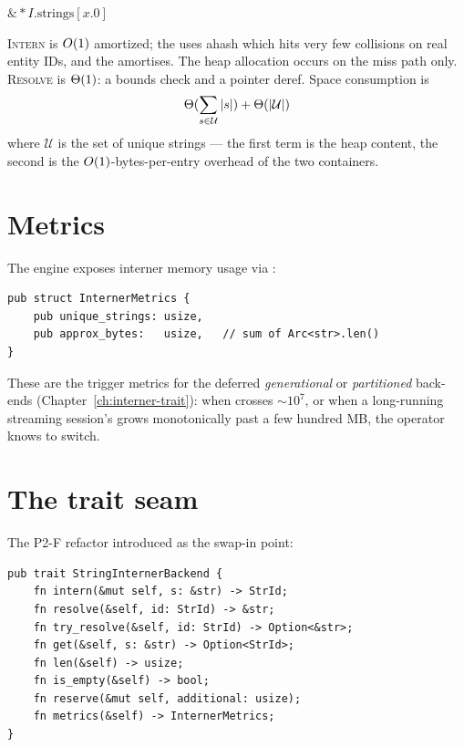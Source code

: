 \begin{algorithm}
\caption{\textsc{Resolve}}\label{alg:resolve}
\Return $\&* I.\text{strings}[x.0]$\;
\end{algorithm}

\begin{complexity}
\textsc{Intern} is $O(1)$ amortized; the  uses
ahash which hits very few collisions on real entity IDs, and the
 amortises. The heap allocation occurs on the miss
path only. \textsc{Resolve} is $\Theta(1)$: a bounds check and a
pointer deref. Space consumption is
\[
    \Theta(\sum_{s \in \mathcal{U}} |s|) + \Theta(|\mathcal{U}|)
\]
where $\mathcal{U}$ is the set of unique strings --- the first
term is the heap content, the second is the $O(1)$-bytes-per-entry
overhead of the two containers.
\end{complexity}

\section{Metrics}

The engine exposes interner memory usage via
:

\begin{lstlisting}[style=rust]
pub struct InternerMetrics {
    pub unique_strings: usize,
    pub approx_bytes:   usize,   // sum of Arc<str>.len()
}
\end{lstlisting}

These are the trigger metrics for the deferred \emph{generational}
or \emph{partitioned} back-ends (Chapter~\ref{ch:interner-trait}):
when  crosses $\sim$$10^7$, or when a
long-running streaming session's  grows
monotonically past a few hundred MB, the operator knows to switch.

\section{The trait seam}

The P2-F refactor introduced  as the
swap-in point:

\begin{lstlisting}[style=rust]
pub trait StringInternerBackend {
    fn intern(&mut self, s: &str) -> StrId;
    fn resolve(&self, id: StrId) -> &str;
    fn try_resolve(&self, id: StrId) -> Option<&str>;
    fn get(&self, s: &str) -> Option<StrId>;
    fn len(&self) -> usize;
    fn is_empty(&self) -> bool;
    fn reserve(&mut self, additional: usize);
    fn metrics(&self) -> InternerMetrics;
}
\end{lstlisting}

